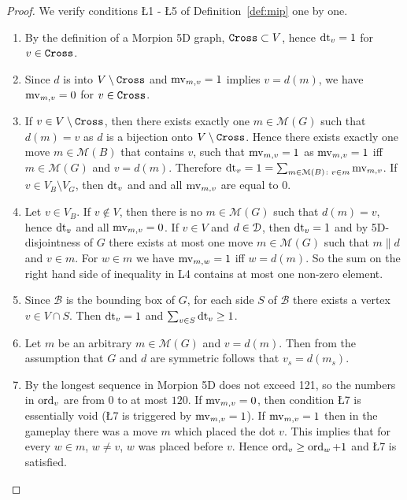\begin{proof}
  We verify conditions \L{1} - \L{5} of Definition~\ref{def:mip} one by one.
    
  \begin{enumerate}[label=\L{\arabic*}.]
   \item  By the definition of a Morpion 5D graph, $\texttt{Cross} \subset V$, hence $\operatorname{dt}_v = 1$ for $v \in \texttt{Cross}$.
  \item Since $d$ is into $V \setminus \texttt{Cross}$ and $\operatorname{mv}_{m, v} = 1$ implies $v = d(m)$, we have
    $\operatorname{mv}_{m, v} = 0$ for $v \in \texttt{Cross}$.
  \item If $v \in V \setminus \texttt{Cross}$, then there exists exactly one $m \in \mathcal{M}(G)$ such that $d(m) = v$
     as $d$ is a bijection onto $V \setminus \texttt{Cross}$.
   Hence  there exists exactly one move $m \in \mathcal{M}(B)$ that contains $v$,
     such that $\operatorname{mv}_{m, v} = 1$ as $\operatorname{mv}_{m,v} = 1$ iff $m \in \mathcal{M}(G)$ and $v = d(m)$.
   Therefore $\operatorname{dt}_v = 1 = \sum_{m \in \mathcal{M}(B) \colon v \in m} \operatorname{mv}_{m,v}$.
  If $v \in V_B \setminus V_G$, then $\operatorname{dt}_v$ and and all $\operatorname{mv}_{m, v}$ are equal to $0$. 
  \item Let $v \in V_B$. If $v \not\in V$, then there is no $m \in \mathcal{M}(G)$ such that
     $d(m) = v$, hence $\operatorname{dt}_v$ and all $\operatorname{mv}_{m,v} = 0$.
     If $v \in V$ and $d \in \mathcal{D}$, then $\operatorname{dt}_v = 1$ and by 5D-disjointness of $G$ there exists
    at most one move 
    $m \in \mathcal{M}(G)$ such that $m \parallel d$ and $v \in m$. 
    For $w \in m$ we have $\operatorname{mv}_{m, w} = 1$ iff $w = d(m)$.
    So the sum on the right hand side of inequality in L4 contains at most one non-zero element.
  \item Since $\mathcal{B}$ is the bounding box of $G$, for each side $S$ of $\mathcal{B}$ there
    exists a vertex $v \in V \cap S$. Then $\operatorname{dt}_v = 1$ and $\sum_{v \in S} \operatorname{dt}_v \geq 1$.  
  \item Let $m$ be an arbitrary $m\in \mathcal{M}(G)$ and $v=d(m)$. Then from the assumption that $G$ and $d$ are symmetric follows
that $v_s=d(m_s)$.
  \item  By \cite{japonczycy} the longest sequence in Morpion 5D does
not exceed 121, so the numbers in $\operatorname{ord}_v$ are from $0$ to at most $120$. If $\operatorname{mv}_{m, v} = 0$, then condition \L{7} is essentially void (\L{7} is triggered by $\operatorname{mv}_{m,v} = 1$).
 If $\operatorname{mv}_{m, v} = 1$ then in the gameplay there was a move $m$ which placed the dot $v$. This implies that for every $w\in m$, $w\neq v$, $w$ was placed before $v$. Hence
$\operatorname{ord}_v \geq \operatorname{ord}_w+1$ and \L{7} is satisfied. 
  \end{enumerate}
\end{proof}
